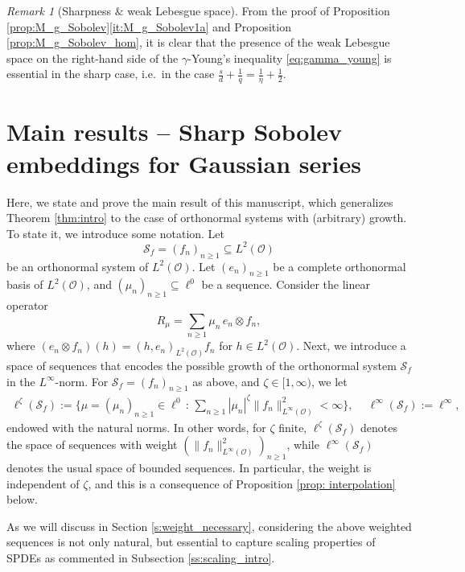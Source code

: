 \documentclass[reqno]{amsart}
\theoremstyle{plain}
\theoremstyle{remark}
\newtheorem{remark}[theorem]{Remark}
\theoremstyle{plain}
\numberwithin{equation}{section}
\newcommand\cO{\mathcal{O}}
\newcommand{\Domm}{\mathcal{O}}
\newcommand{\1}{\one}
\newcommand{\Sf}{\mathcal{S}_{f}}
\begin{document}
\begin{remark}[Sharpness $\&$ weak Lebesgue space]
\label{r:necessity_of_weak_spaces}
From the proof of Proposition \ref{prop:M_g_Sobolev}\eqref{it:M_g_Sobolev1a} and Proposition \ref{prop:M_g_Sobolev_hom}, it is clear that the presence of the weak Lebesgue space on the right-hand side of the $\gamma$-Young's inequality \eqref{eq:gamma_young} is essential in the sharp case, i.e.\ in the case
$
\frac{s}{d} + \frac{1}{q}  = \frac{1}{\eta} + \frac{1}{2}.
$
\end{remark}


\section{Main results -- Sharp Sobolev embeddings for Gaussian series}
\label{s:main_result}
%
Here, we state and prove the main result of this manuscript, which generalizes Theorem \ref{thm:intro} to the case of orthonormal systems with (arbitrary) growth. To state it, we introduce some notation. Let 
$$\Sf=(f_n)_{n\geq 1}\subseteq L^2(\Domm)$$ be an orthonormal system of $L^2(\Domm)$.
Let $(e_n)_{n\geq 1}$ be a complete orthonormal basis of $L^2(\Domm)$, and $(\mu_n)_{n\geq 1}\subseteq \ell^0$ be a sequence. Consider the linear operator 
\begin{equation}
\label{eq:Tmu_def} 
R_\mu = \sum_{n\geq  1} \mu_n \, e_n \otimes  f_n,
\end{equation}
where $(e_n\otimes  f_n)(h)=(h,e_n)_{L^2(\Domm)} f_n$ for $h\in L^2(\Domm)$. 
Next, we introduce a space of sequences that encodes the possible growth of the orthonormal system $\Sf$ in the $L^\infty$-norm. 
For  $\Sf=(f_n)_{n\geq 1}$ as above, and $\zeta\in [1,\infty)$, we let
\begin{equation}
\begin{aligned}
\label{eq:ellzeta_F}
\ell^\zeta(\Sf):= 
\Big\{ \mu=(\mu_n)_{n\geq 1}\in \ell^0\,:\, \sum_{n\geq 1} |\mu_n|^\zeta \|f_n\|_{L^\infty(\cO)}^{2}<\infty \Big\}, \  \quad
\ell^\infty(\Sf):=\ell^\infty,
\end{aligned}
\end{equation}
endowed with the natural norms. In other words, for $\zeta$ finite, $\ell^\zeta(\Sf)$ denotes the space of sequences with weight $(\|f_n\|_{L^\infty(\cO)}^{2} )_{n\geq 1}$, while $\ell^\infty(\Sf)$ denotes the usual space of bounded sequences. In particular, the weight is independent of $\zeta$, and this is a consequence of Proposition \ref{prop: interpolation} below.

As we will discuss in Section \ref{s:weight_necessary}, considering the above weighted sequences is not only natural, but essential to capture scaling properties of SPDEs as commented in Subsection \ref{ss:scaling_intro}.
\end{document}
